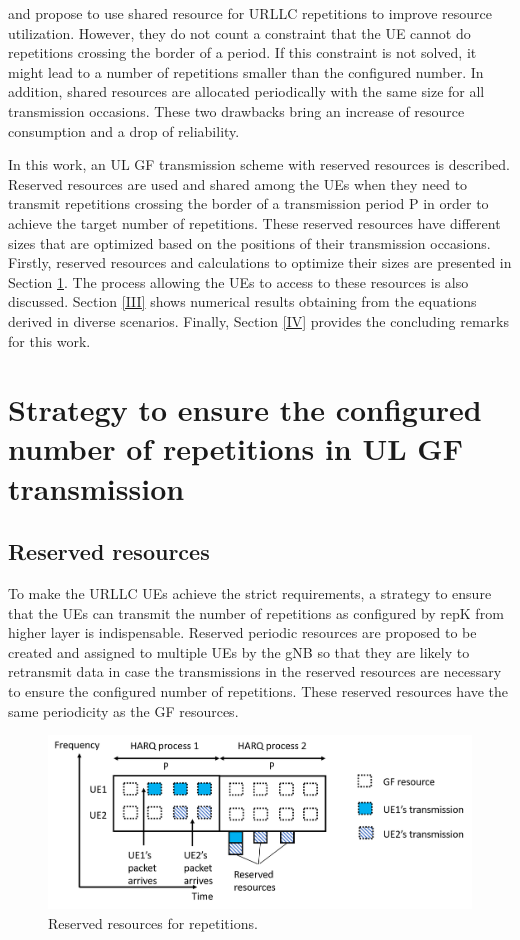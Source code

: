 \documentclass[conference]{IEEEtran}
\begin{document}
\cite{b5} and \cite{b7} propose to use shared resource for URLLC repetitions to improve resource utilization. However, they do not count a constraint that the UE cannot do repetitions crossing the border of a period. If this constraint is not solved, it might lead to a number of repetitions smaller than the configured number. In addition, shared resources are allocated periodically with the same size for all transmission occasions. These two drawbacks bring an increase of resource consumption and a drop of reliability.

In this work, an UL GF transmission scheme with reserved resources is described. Reserved resources are used and shared among the UEs when they need to transmit repetitions crossing the border of a transmission period P in order to achieve the target number of repetitions. These reserved resources have different sizes that are optimized based on the positions of their transmission occasions.  
Firstly, reserved resources and calculations to optimize their sizes are presented in Section \ref{II}. The process allowing the UEs to access to these resources is also discussed. Section \ref{III} shows numerical results obtaining from the equations derived in diverse scenarios. Finally, Section \ref{IV} provides the concluding remarks for this work.

\section{Strategy to ensure the configured number of repetitions in UL GF transmission}\label{II}

\subsection{Reserved resources}\label{IIAA}
To make the URLLC UEs achieve the strict requirements, a strategy to ensure that the UEs can transmit the number of repetitions as configured by repK from higher layer is indispensable. Reserved periodic resources are proposed to be created and assigned to multiple UEs by the gNB so that they are likely to retransmit data in case the transmissions in the reserved resources are necessary to ensure the configured number of repetitions. These reserved resources have the same periodicity as the GF resources.

\begin{figure}[htbp]
\centerline{\includegraphics[scale=0.30]{fig2.png}}
\caption{Reserved resources for repetitions.}
\label{fig2}
\end{figure}
\end{document}
